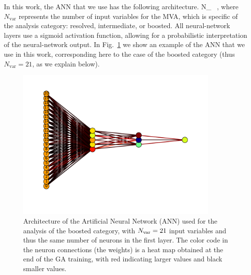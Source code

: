 In this work, the ANN that we use has the following architecture.
\be
\label{eq:nn1}
N_{} \, ,
\ee
where $N_{\mathrm{var}}$ represents the number of input variables for the MVA,
which is specific of the analysis category: resolved, intermediate, or boosted.
%
All neural-network layers use a sigmoid activation function, allowing
for a probabilistic
interpretation of the neural-network output.
%
In Fig.~\ref{fig:nnarch} we show an example of the ANN that we use in this work, corresponding here
to the case of the boosted category (thus $N_{\mathrm{var}}=21$, as we explain below).

\begin{figure}[t]
  \begin{center}
      \vspace{-1cm}
  \includegraphics[width=0.90\textwidth]{plots/bst_nnarch_noPU.pdf}
  \vspace{-2cm}
  \caption{\small Architecture of the Artificial
    Neural Network (ANN)
    used for the analysis of the
    boosted
    category, with $N_{\rm var}=21$ input variables and thus
    the same number of neurons
  in the first layer.
  The color code in the neuron connections (the weights) is a heat map obtained
  at the end of the GA training,
  with red indicating larger values and black smaller values.
}
\label{fig:nnarch}
\end{center}
\end{figure}

